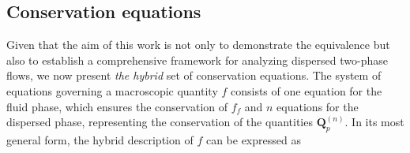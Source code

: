\subsection{Conservation equations}

Given that the aim of this work is not only to demonstrate the equivalence but also to establish a comprehensive framework for analyzing dispersed two-phase flows, we now present \textit{the hybrid} set of conservation equations.
The system of equations governing a macroscopic quantity $f$ consists of one equation for the fluid phase, which ensures the conservation of $f_f$ and $n$ equations for the dispersed phase, representing the conservation of the quantities $\textbf{Q}_p^{(n)}$.  
In its most general form, the hybrid description of $f$ can be expressed as
